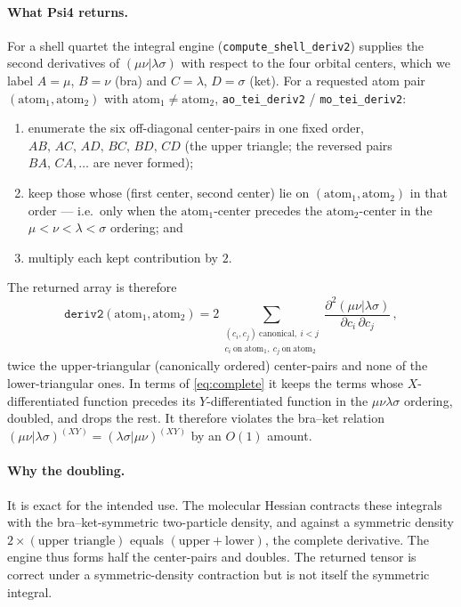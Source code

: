 \documentclass[11pt]{article}
\begin{document}
\paragraph{What Psi4 returns.} For a shell quartet the integral engine
(\texttt{compute\_shell\_deriv2}) supplies the second derivatives of
$(\mu\nu|\lambda\sigma)$ with respect to the four orbital centers, which we label
$A\!=\!\mu$, $B\!=\!\nu$ (bra) and $C\!=\!\lambda$, $D\!=\!\sigma$ (ket). For a
requested atom pair $(\mathrm{atom}_1,\mathrm{atom}_2)$ with
$\mathrm{atom}_1\neq\mathrm{atom}_2$, \texttt{ao\_tei\_deriv2} /
\texttt{mo\_tei\_deriv2}:
%
\begin{enumerate}
\item enumerate the six off-diagonal center-pairs in one fixed order,
$AB,\,AC,\,AD,\,BC,\,BD,\,CD$ (the upper triangle; the reversed pairs
$BA,\,CA,\dots$ are never formed);
\item keep those whose (first center, second center) lie on
$(\mathrm{atom}_1,\mathrm{atom}_2)$ in that order --- i.e.\ only when the
$\mathrm{atom}_1$-center precedes the $\mathrm{atom}_2$-center in the
$\mu<\nu<\lambda<\sigma$ ordering; and
\item multiply each kept contribution by $2$.
\end{enumerate}
%
The returned array is therefore
%
\begin{equation}
\texttt{deriv2}(\mathrm{atom}_1,\mathrm{atom}_2)
= 2\!\!\!\sum_{\substack{(c_i,c_j)\ \text{canonical},\ i<j\\
   c_i\ \text{on}\ \mathrm{atom}_1,\ c_j\ \text{on}\ \mathrm{atom}_2}}\!\!\!
   \frac{\partial^2 (\mu\nu|\lambda\sigma)}{\partial c_i\,\partial c_j}\, ,
\label{eq:raw}
\end{equation}
%
twice the upper-triangular (canonically ordered) center-pairs and none of the
lower-triangular ones. In terms of \eqref{eq:complete} it keeps the terms whose
$X$-differentiated function precedes its $Y$-differentiated function in the
$\mu\nu\lambda\sigma$ ordering, doubled, and drops the rest. It therefore violates
the bra--ket relation $(\mu\nu|\lambda\sigma)^{(XY)}=(\lambda\sigma|\mu\nu)^{(XY)}$
by an $O(1)$ amount.

\paragraph{Why the doubling.} It is exact for the intended use. The molecular
Hessian contracts these integrals with the bra--ket-symmetric two-particle
density, and against a symmetric density $2\times(\text{upper triangle})$ equals
$(\text{upper}+\text{lower})$, the complete derivative. The engine thus forms half
the center-pairs and doubles. The returned tensor is correct under a
symmetric-density contraction but is not itself the symmetric integral.
\end{document}
